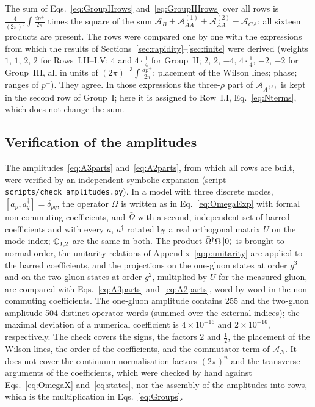 The sum of Eqs.~\eqref{eq:GroupIIrows} and~\eqref{eq:GroupIIIrows} over all rows is $\frac{4}{(2\pi)^3}\int\frac{dp^+}{2\pi}$ times the square of the sum $\mathcal A_B+\mathcal A^{(1)}_{AA}+\mathcal A^{(2)}_{AA}-\mathcal A_{CA}$: all sixteen products are present. The rows were compared one by one with the expressions from which the results of Sections~\ref{sec:rapidity}--\ref{sec:finite} were derived (weights $1$, $1$, $2$, $2$ for Rows~I.II--I.V; $4$ and $4\cdot\frac14$ for Group~II; $2$, $2$, $-4$, $4\cdot\frac14$, $-2$, $-2$ for Group~III, all in units of $(2\pi)^{-3}\int\frac{dp^+}{2\pi}$; placement of the Wilson lines; phase; ranges of $p^+$). They agree. In those expressions the three-$\rho$ part of $\mathcal A_{A^{(3)}}$ is kept in the second row of Group~I; here it is assigned to Row~I.I, Eq.~\eqref{eq:Nterms}, which does not change the sum.

\subsection{Verification of the amplitudes}\label{app:rows_check}

The amplitudes~\eqref{eq:A3parts} and~\eqref{eq:A2parts}, from which all rows are built, were verified by an independent symbolic expansion (script \texttt{scripts/check\_amplitudes.py}). In a model with three discrete modes, $[a_p,a^\dagger_q]=\delta_{pq}$, the operator $\Omega$ is written as in Eq.~\eqref{eq:OmegaExp} with formal non-commuting coefficients, and $\bar\Omega$ with a second, independent set of barred coefficients and with every $a$, $a^\dagger$ rotated by a real orthogonal matrix $U$ on the mode index; $\mathbb{C}_{1,2}$ are the same in both. The product $\bar\Omega^\dagger\Omega\ket0$ is brought to normal order, the unitarity relations of Appendix~\ref{app:unitarity} are applied to the barred coefficients, and the projections on the one-gluon states at order $g^3$ and on the two-gluon states at order $g^2$, multiplied by $U$ for the measured gluon, are compared with Eqs.~\eqref{eq:A3parts} and~\eqref{eq:A2parts}, word by word in the non-commuting coefficients. The one-gluon amplitude contains 255 and the two-gluon amplitude 504 distinct operator words (summed over the external indices); the maximal deviation of a numerical coefficient is $4\times10^{-16}$ and $2\times10^{-16}$, respectively. The check covers the signs, the factors $2$ and $\frac12$, the placement of the Wilson lines, the order of the coefficients, and the commutator term of $\mathcal A_N$. It does not cover the continuum normalisation factors $(2\pi)^n$ and the transverse arguments of the coefficients, which were checked by hand against Eqs.~\eqref{eq:OmegaX} and~\eqref{eq:states}, nor the assembly of the amplitudes into rows, which is the multiplication in Eqs.~\eqref{eq:Groups}.

